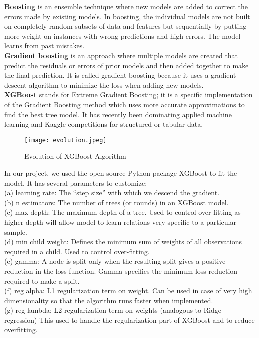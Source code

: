 \documentclass[fleqn,10pt]{SelfArx} %
\begin{document}
\noindent
\textbf{Boosting} is an ensemble technique where new models are added to correct the errors made by existing models. In boosting, the individual models are not built on completely random subsets of data and features but sequentially by putting more weight on instances with wrong predictions and high errors. The model learns from past mistakes.\cite{xgboost}\\
\newline
\noindent
\textbf{Gradient boosting} is an approach where multiple models are created that predict the residuals or errors of prior models and then added together to make the final prediction. It is called gradient boosting because it uses a gradient descent algorithm to minimize the loss when adding new models. \\
\newline
\noindent
\textbf{XGBoost} stands for Extreme Gradient Boosting; it is a specific implementation of the Gradient Boosting method which uses more accurate approximations to find the best tree model. It has recently been dominating applied machine learning and Kaggle competitions for structured or tabular data. \\

\begin{figure}[ht]\centering %
\texttt{[image: evolution.jpeg]}
\caption{Evolution of XGBoost Algorithm}
\label{fig:view}
\end{figure}

\noindent
In our project, we used the open source Python package XGBoost to fit the model. It has several parameters to customize:\\
(a) learning rate: The “step size” with which we descend the gradient.\\
(b)  n estimators: The number of trees (or rounds) in an XGBoost model.\\
(c)  max depth: The maximum depth of a tree. Used to control over-fitting as higher depth will allow model to learn relations very specific to a particular sample.\\
(d)  min child weight: Defines the minimum sum of weights of all observations required in a child. Used to control over-fitting. \\
(e)  gamma: A node is split only when the resulting split gives a positive reduction in the loss function. Gamma specifies the minimum loss reduction required to make a split. \\
(f) reg alpha: L1 regularization term on weight. Can be used in case of very high dimensionality so that the algorithm runs faster when implemented.\\
(g)  reg lambda: L2 regularization term on weights (analogous to Ridge regression) This used to handle the regularization part of XGBoost and to reduce overfitting.\\
\end{document}
